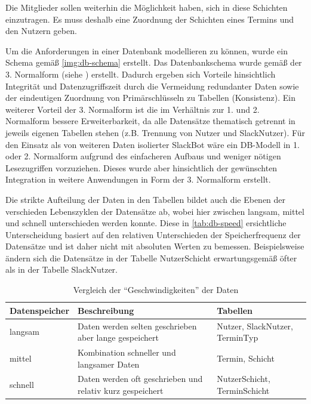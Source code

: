 Die Mitglieder sollen weiterhin die Möglichkeit haben, sich in diese Schichten einzutragen. Es muss deshalb eine Zuordnung der Schichten eines Termins und den Nutzern geben. 


Um die Anforderungen in einer Datenbank modellieren zu können, wurde ein Schema gemäß \autoref{img:db-schema} erstellt. Das Datenbankschema wurde gemäß der 3. Normalform (siehe \cite{CoddRelationalModelData1970}) erstellt. Dadurch ergeben sich Vorteile hinsichtlich Integrität und Datenzugriffszeit durch die Vermeidung redundanter Daten sowie der eindeutigen Zuordnung von Primärschlüsseln zu Tabellen (Konsistenz). Ein weiterer Vorteil der 3. Normalform ist die im Verhältnis zur 1. und 2. Normalform bessere Erweiterbarkeit, da alle Datensätze thematisch getrennt in jeweils eigenen Tabellen stehen (z.B. Trennung von Nutzer und SlackNutzer). 
Für den Einsatz als von weiteren Daten isolierter SlackBot wäre ein DB-Modell in 1. oder 2. Normalform aufgrund des einfacheren Aufbaus und weniger nötigen Lesezugriffen vorzuziehen. Dieses wurde aber hinsichtlich der gewünschten Integration in weitere Anwendungen in Form der 3. Normalform erstellt.

Die strikte Aufteilung der Daten in den Tabellen bildet auch die Ebenen der verschieden Lebenszyklen der Datensätze ab, wobei hier zwischen langsam, mittel und schnell unterschieden werden konnte. Diese in \autoref{tab:db-speed} ersichtliche Unterscheidung basiert auf den relativen Unterschieden der Speicherfrequenz der Datensätze und ist daher nicht mit absoluten Werten zu bemessen. Beispielsweise ändern sich die Datensätze in der Tabelle NutzerSchicht erwartungsgemäß öfter als in der Tabelle SlackNutzer.

\begin{table}[H]
    \begin{tabularx}{0.9\columnwidth}{|l|X|X|}
    \hline
    \textbf{Datenspeicher} & \textbf{Beschreibung} & \textbf{Tabellen} \\
    \hline
    langsam & Daten werden selten geschrieben aber lange gespeichert & Nutzer, SlackNutzer, TerminTyp \\
    \hline
    mittel & Kombination schneller und langsamer Daten & Termin, Schicht \\
    \hline
    schnell & Daten werden oft geschrieben und relativ kurz gespeichert & NutzerSchicht, TerminSchicht \\
    \hline
    \end{tabularx}
    \caption{Vergleich der \enquote{Geschwindigkeiten} der Daten}
    \label{tab:db-speed}
\end{table}

